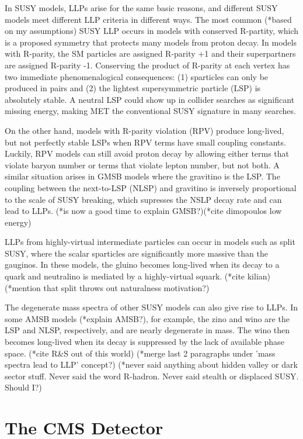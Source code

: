 \documentclass[12pt]{article}
\begin{document}
    In SUSY models, LLPs arise for the same basic reasons, and different SUSY models meet different LLP criteria in different ways. The most common (*based on my assumptions) SUSY LLP occurs in models with conserved R-partity, which is a proposed symmetry that protects many models from proton decay. In models with R-parity, the SM particles are assigned R-parity +1 and their superpartners are assigned R-parity -1. Conserving the product of R-parity at each vertex has two immediate phenomenalogical consequences: (1) sparticles can only be produced in pairs and (2) the lightest supersymmetric particle (LSP) is absolutely stable. A neutral LSP could show up in collider searches as significant missing energy, making MET the conventional SUSY signature in many searches.

    On the other hand, models with R-parity violation (RPV) produce long-lived, but not perfectly stable LSPs when RPV terms have small coupling constants. Luckily, RPV models can still avoid proton decay by allowing either terms that violate baryon number or terms that violate lepton number, but not both. A similar situation arises in GMSB models where the gravitino is the LSP. The coupling between the next-to-LSP (NLSP) and gravitino is inversely proportional to the scale of SUSY breaking, which supresses the NSLP decay rate and can lead to LLPs. (*is now a good time to explain GMSB?)(*cite dimopoulos low energy)

    LLPs from highly-virtual intermediate particles can occur in models such as split SUSY, where the scalar sparticles are significantly more massive than the gauginos. In these models, the gluino becomes long-lived when its decay to a quark and neutralino is mediated by a highly-virtual squark. (*cite kilian) (*mention that split throws out naturalness motivation?)

    The degenerate mass spectra of other SUSY models can also give rise to LLPs. In some AMSB models (*explain AMSB?), for example, the zino and wino are the LSP and NLSP, respectively, and are nearly degenerate in mass. The wino then becomes long-lived when its decay is suppressed by the lack of available phase space. (*cite R\&S out of this world)
    (*merge last 2 paragraphs under 'mass spectra lead to LLP' concept?)
    (*never said anything about hidden valley or dark sector stuff. Never said the word R-hadron. Never said stealth or displaced SUSY. Should I?)

\section{The CMS Detector}
\end{document}
